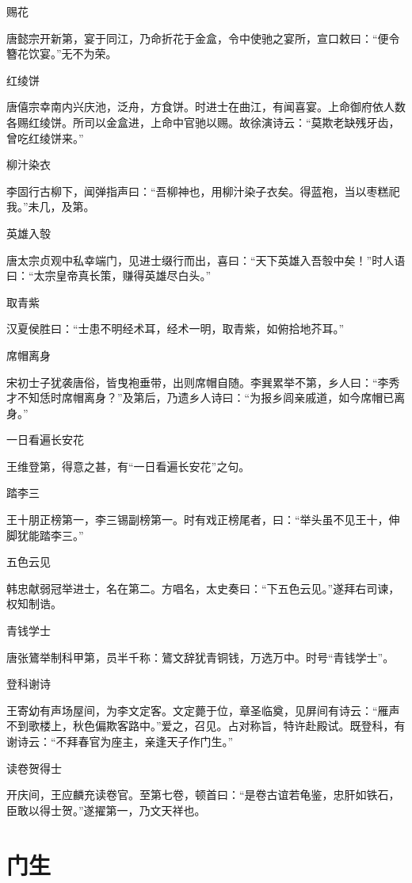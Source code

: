 \documentclass[a4paper,12pt,UTF8,twoside]{ctexbook}
\begin{document}
    赐花
    
    唐懿宗开新第，宴于同江，乃命折花于金盒，令中使驰之宴所，宣口敕曰：“便令簪花饮宴。”无不为荣。
    
    红绫饼
    
    唐僖宗幸南内兴庆池，泛舟，方食饼。时进士在曲江，有闻喜宴。上命御府依人数各赐红绫饼。所司以金盒进，上命中官驰以赐。故徐演诗云：“莫欺老缺残牙齿，曾吃红绫饼来。”
    
    柳汁染衣
    
    李固行古柳下，闻弹指声曰：“吾柳神也，用柳汁染子衣矣。得蓝袍，当以枣糕祀我。”未几，及第。
    
    英雄入彀
    
    唐太宗贞观中私幸端门，见进士缀行而出，喜曰：“天下英雄入吾彀中矣！”时人语曰：“太宗皇帝真长策，赚得英雄尽白头。”
    
    取青紫
    
    汉夏侯胜曰：“士患不明经术耳，经术一明，取青紫，如俯拾地芥耳。”
    
    席帽离身
    
    宋初士子犹袭唐俗，皆曳袍垂带，出则席帽自随。李巽累举不第，乡人曰：“李秀才不知恁时席帽离身？”及第后，乃遗乡人诗曰：“为报乡闾亲戚道，如今席帽已离身。”
    
    一日看遍长安花
    
    王维登第，得意之甚，有“一日看遍长安花”之句。
    
    踏李三
    
    王十朋正榜第一，李三锡副榜第一。时有戏正榜尾者，曰：“举头虽不见王十，伸脚犹能踏李三。”
    
    五色云见
    
    韩忠献弱冠举进士，名在第二。方唱名，太史奏曰：“下五色云见。”遂拜右司谏，权知制诰。
    
    青钱学士
    
    唐张鷟举制科甲第，员半千称：鷟文辞犹青铜钱，万选万中。时号“青钱学士”。
    
    登科谢诗
    
    王寄幼有声场屋间，为李文定客。文定薨于位，章圣临奠，见屏间有诗云：“雁声不到歌楼上，秋色偏欺客路中。”爱之，召见。占对称旨，特许赴殿试。既登科，有谢诗云：“不拜春官为座主，亲逢天子作门生。”
    
    读卷贺得士
    
    开庆间，王应麟充读卷官。至第七卷，顿首曰：“是卷古谊若龟鉴，忠肝如铁石，臣敢以得士贺。”遂擢第一，乃文天祥也。
    
    \chapter{门生}
    
\end{document}
